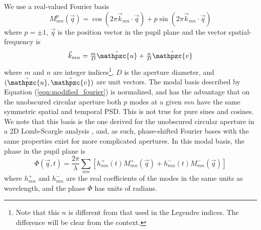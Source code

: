 \documentclass[10pt,preprint]{aastex631}
\newcommand{\mpfadd}[1]{\textcolor{avocado}{#1}}
\begin{document}

We use a real-valued Fourier basis
\begin{equation}
M_{mn}^p(\vec{q}) = \cos(2\pi \vec{k}_{mn} \cdot \vec{q}) + p  \sin(2\pi \vec{k}_{mn} \cdot \vec{q})
\label{eqn:modified_fourier}
\end{equation}
where $p=\pm 1$, $\vec{q}$ is the position vector in the pupil plane and the vector spatial-frequency is 
\begin{equation}
\textstyle\vec{k}_{mn} = \textstyle\frac{m}{D} \hat{\mathpzc{u}} + \textstyle\frac{n}{D} \hat{\mathpzc{v}}
\label{eqn:kq_def}
\end{equation}
where $m$ and $n$ are integer indices\footnote{Note that this $n$ is different from that used in the Legendre indices.  The difference will be clear from the context.}, $D$ is the aperture diameter, and $(\hat{\mathpzc{u}},\hat{\mathpzc{v}})$ are unit vectors.  The modal basis described by Equation (\ref{eqn:modified_fourier}) is normalized, and has the advantage that on the unobscured circular aperture both $p$ modes at a given $mn$ have the same symmetric spatial and temporal PSD.  This is not true for pure sines and cosines.  We note that this basis is the one derived for the unobscured circular aperture in a 2D Lomb-Scargle analysis \citep{2020arXiv200110200S}, and, as such, phase-shifted Fourier bases with the same properties exist for more complicated apertures.  In this modal basis, the phase in the pupil plane is
\begin{equation}
\Phi(\vec{q},t) = \frac{2\pi}{\lambda} \sum\limits_{mn} \left[ h_{mn}^{+}(t) M_{mn}^{+}(\vec{q}) + h_{mn}^{-}(t) M_{mn}^{-}(\vec{q})\right]
\label{eqn:phi_expansion}
\end{equation}
where $h_{mn}^{+}$ and $h_{mn}^{-}$ are the \mpfadd{real} coefficients of the modes in the same units as wavelength, and the phase $\Phi$ has units of radians.
\end{document}
